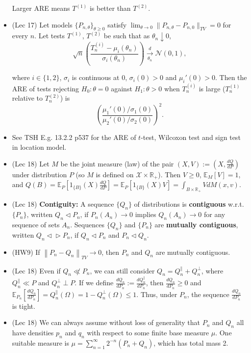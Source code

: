\documentclass[twoside]{article}
\newcommand{\dis}{\displaystyle}
\newcommand{\norm}[1]{\left\|{#1}\right\|} %
\newcommand\bbE{\mathbb{E}}
\newcommand\bbR{\mathbb{R}}
\newcommand\calX{\mathcal{X}}
\newcommand\sg{\sigma}
\def\t{\theta}
\newcommand\goesto{\rightarrow}
\begin{document}
\begin{itemize}
Larger ARE means $T^{(1)}$ is better than $T^{(2)}$.

\item (Lec 17) Let models $\{P_{n,\t}\}_{\theta \geq 0}$ satisfy $\dis\lim_{\theta \to 0} \|P_{n,\theta}-P_{n,0}\|_{TV} = 0$ for every $n$. Let tests $T^{(1)}$, $T^{(2)}$ be such that as $\t_n \downarrow 0$, 
\[\sqrt{n}\left(\frac{T_n^{(i)} - \mu_i(\t_n)}{\sigma_i(\t_n)} \right) \xrightarrow[\t_n]{d} \mathcal{N}(0,1), \]

where $i\in\{1,2\}$, $\sigma_i$ is continuous at $0$, $\sg_i(0) > 0$ and $\mu_i ' (0) > 0$. Then the ARE of tests rejecting $H_0: \theta = 0$ against $H_1: \theta > 0$ when $T_n^{(i)}$ is large ($T_n^{(1)}$ relative to $T_n^{(2)}$) is
\[\left( \frac{\mu_1'(0)/ \sigma_1 (0)}{\mu_2'(0)/ \sigma_2 (0)} \right)^2. \]

\item See TSH E.g. 13.2.2 p537 for the ARE of $t$-test, Wilcoxon test and sign test in location model.

\item (Lec 18) Let $M$ be the joint measure (law) of the pair $ (X,V) :=\left(X, \dis\frac{dQ}{dP}\right) $ under distribution $P$ (so $M$ is defined on $\calX \times \bbR_+$). Then $V \geq 0$, $\bbE_M[V] = 1$, and $Q(B) = \bbE_P\left[1_{\{B\}}(X)\dis\frac{dQ}{dP}\right] = \bbE_P[1_{\{B\}}(X)V] = \int_{B \times \bbR_+} VdM(x,v)$.  

\item (Lec 18) \textbf{Contiguity:} A sequence $\{Q_n\}$ of distributions is \textbf{contiguous} w.r.t. $\{P_n\}$, written $Q_n \triangleleft P_n$, if $P_n(A_n) \rightarrow 0$ implies $Q_n(A_n) \rightarrow 0$ for any sequence of sets $A_n$. Sequences $\{Q_n\}$ and $\{P_n\}$ are \textbf{mutually contiguous}, written $Q_n \triangleleft \!\triangleright P_n$, if $Q_n \triangleleft P_n$ and $P_n \triangleleft Q_n$.

\item (HW9) If $\norm{P_n - Q_n}_{TV} \goesto 0$, then $P_n$ and $Q_n$ are mutually contiguous.

\item (Lec 18) Even if $Q_n \not \ll P_n$, we can still consider $Q_n = Q_n^\| + Q_n^\perp$, where $Q_n^\| \ll P$ and $Q_n^\perp \perp P$. If we define $\frac{dQ_n}{dP_n} := \frac{dQ_n^\|}{dP_n}$, then $\frac{dQ_n}{dP_n} \geq 0$ and $\bbE_{P_n}\left[\frac{dQ_n}{dP_n}\right] = Q_n^\|(\Omega) = 1 - Q_n^\perp(\Omega) \leq 1$. Thus, under $P_n$, the sequence $\frac{dQ_n}{dP_n}$ is tight. 

\item (Lec 18) We can always assume without loss of generality that $P_n$ and $Q_n$ all have densities $p_n$ and $q_n$ with respect to some finite base measure $\mu$. One suitable measure is $\mu = \dis\sum_{n=1}^\infty 2^{-n} (P_n + Q_n)$, which has total mass 2. 


\end{itemize}
\end{document}
